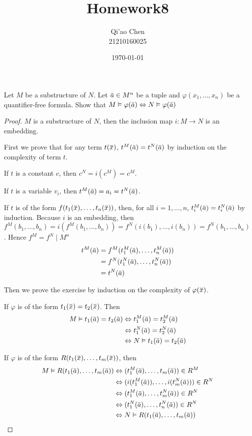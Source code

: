 \documentclass[11pt]{article}
\author{Qi'ao Chen\\21210160025}
\date{\today}
\title{Homework8}
\begin{document}
\maketitle
\begin{exercise}
Let \(M\) be a substructure of \(N\). Let \(\bara\in M^n\) be a tuple and \(\varphi(x_1,\dots,x_n)\) be a
quantifier-free formula. Show that \(M\vDash\varphi(\bara)\Leftrightarrow N\vDash\varphi(\bara)\)
\end{exercise}

\begin{proof}
\(M\) is a substructure of \(N\), then the inclusion map \(i:M\to N\) is an embedding.

First we prove that for any term \(t(\barx)\), \(t^M(\bara)=t^N(\bara)\) by induction on the
complexity of term \(t\).

If \(t\) is a constant \(c\), then \(c^N=i(c^M)=c^M\).

If \(t\) is a variable \(v_i\), then \(t^M(\bara)=a_i=t^N(\bara)\).

If \(t\) is of the form \(f(t_1(\barx),\dots,t_n(\barx))\), then, for
all \(i=1,\dots,n\), \(t_i^M(\bara)=t_i^N(\bara)\) by induction. Because
\(i\) is an embedding, then \(f^M(b_1,\dots,b_n)=i(f^M(b_1,\dots,b_n))=f^N(i(b_1),\dots,i(b_n))=f^N(b_1,\dots,b_n)\).
Hence \(f^M=f^N\mid M^n\)
\begin{align*}
t^M(\bara)&=f^M(t_1^M(\bara),\dots,t_n^M(\bara))\\
&=f^N(t_1^N(\bara),\dots,t_n^N(\bara))\\
&=t^N(\bara)
\end{align*}

Then we prove the exercise by induction on the complexity of \(\varphi(\barx)\).

If \(\varphi\) is of the form \(t_1(\barx)=t_2(\barx)\). Then
\begin{align*}
M\vDash t_1(\bara)=t_2(\bara)&\Leftrightarrow t_1^M(\bara)=t_2^M(\bara)\\
&\Leftrightarrow t_1^N(\bara)=t_2^N(\bara)\\
&\Leftrightarrow N\vDash t_1(\bara)=t_2(\bara)
\end{align*}

If \(\varphi\) is of the form \(R(t_1(\barx),\dots,t_m(\barx))\), then
\begin{align*}
M\vDash R(t_1(\bara),\dots,t_m(\bara))&\Leftrightarrow (t_1^M(\bara),\dots,t_m(\bara))\in R^M\\
&\Leftrightarrow(i(t_1^M(\bara)),\dots,i(t_m^N(\bara)))\in R^N\\
&\Leftrightarrow(t_1^M(\bara),\dots,t_m^N(\bara))\in R^N\\
&\Leftrightarrow(t_1^N(\bara),\dots,t_n^N(\bara))\in R^N\\
&\Leftrightarrow N\vDash R(t_1(\bara),\dots,t_m(\bara))
\end{align*}


\end{proof}
\end{document}
